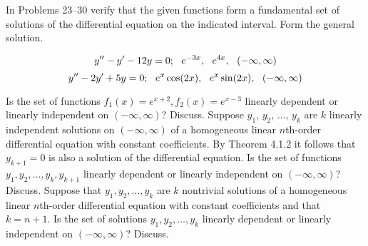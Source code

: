 \documentclass[chapter=4,section=3]{math252homework}
\begin{document}

In Problems 23--30 verify that the given functions form a fundamental set of solutions of the differential equation on the indicated interval. Form the general solution.

\begin{problems}[label=\arabic*.,start=23]
    \problem[prb:4.1-23] \[ y'' - y' - 12y = 0;\mbox{{ }{ }} e^{-3x},\mbox{{ }{ }} e^{4x},\mbox{{ }{ }} (-\infty, \infty) \]					%
	\setcounter{problemsi}{24}
	\problem[prb:4.1-25] \[ y'' - 2y' + 5y = 0;\mbox{{ }{ }} e^{x}\cos(2x), \mbox{{ }{ }} e^{x}\sin(2x),\mbox{{ }{ }} (-\infty, \infty) \]	%
\end{problems}

\begin{problems}[label=\arabic*.,start=40]
    \problem[prb:4.1-40] Is the set of functions $f_{1}(x) = e^{x+2}, f_{2}(x) = e^{x-3}$ linearly dependent or linearly independent on $(-\infty, \infty)$? Discuss. %
	\problem[prb:4.1-41] Suppose $y_{1}$, $y_{2}$, $\dots$, $y_{k}$ are $k$ linearly independent solutions on $(-\infty, \infty)$ of a homogeneous linear $n$th-order differential equation with constant coefficients. By Theorem 4.1.2 it follows that $y_{k+1}=0$ is also a solution of the differential equation. Is the set of functions $y_{1}, y_{2}, \dots, y_{k}, y_{k+1}$ linearly dependent or linearly independent on $(-\infty, \infty)$? Discuss. %
	\problem[prb:4.1-42] Suppose that $y_{1}, y_{2}, \dots, y_{k}$ are $k$ nontrivial solutions of a homogeneous linear $n$th-order differential equation with constant coefficients and that $k=n+1$. Is the set of solutions $y_{1}, y_{2}, \dots, y_{k}$ linearly dependent or linearly independent on $(-\infty, \infty)$? Discuss. %
\end{problems}
\end{document}
